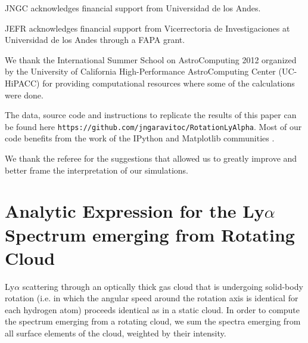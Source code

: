\documentclass{emulateapj}
\begin{document}
JNGC acknowledges financial support from Universidad de los
Andes. 

JEFR acknowledges financial support from Vicerrectoria de
Investigaciones at Universidad de los Andes through a FAPA grant.

We thank the International Summer School on AstroComputing
2012 organized by the University of California High-Performance
AstroComputing Center (UC-HiPACC) for providing computational
resources where some of the calculations were done. 

The data, source code and instructions to
replicate the results of this paper can be found
here {\texttt{https://github.com/jngaravitoc/RotationLyAlpha}}.
Most of our code benefits from the work of the IPython and Matplotlib
communities \citep{IPython,matplotlib}.

We thank the referee for the suggestions that allowed us to greatly
improve and better frame the interpretation of our simulations. 


\appendix
\section{Analytic Expression for the Ly$\alpha$ Spectrum
  emerging from Rotating Cloud}  
\label{sec:app}

Ly$\alpha$ scattering through an optically thick gas cloud that is
undergoing solid-body rotation (i.e. in which the angular speed around the
rotation axis is identical for each hydrogen atom) proceeds identical
as in a static cloud. In order to compute the spectrum emerging from a rotating cloud, we sum
the spectra emerging from all surface elements of the cloud, weighted by their intensity.  
\end{document}
